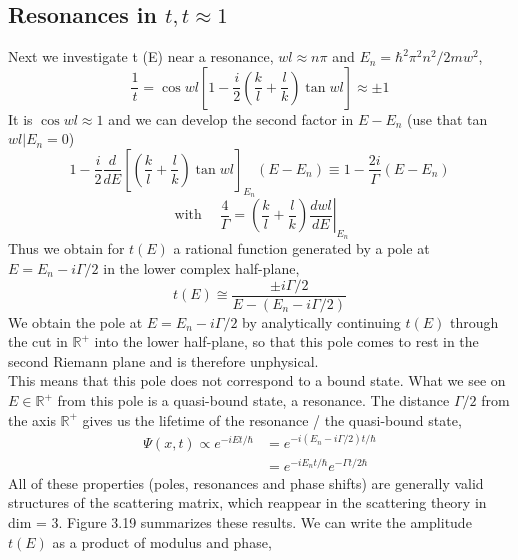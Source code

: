 \subsection{Resonances in $t, t \approx 1$}
 Next we investigate t (E) near a resonance, $wl ≈ n\pi$ and $E_n = \hbar^2\pi^2 n^2 / 2mw^2$,
\begin{equation}
    \frac{1}{t}=\cos w l\left[1-\frac{i}{2}\left(\frac{k}{l}+\frac{l}{k}\right) \tan w l\right] \approx \pm 1
    \end{equation}
It is $\operatorname{cos} wl \approx 1$ and we can develop the second factor in $E - E_n$ (use that tan $wl | E_n = 0$)
\begin{equation}
    1-\frac{i}{2} \frac{d}{d E}\left[\left(\frac{k}{l}+\frac{l}{k}\right) \tan w l\right]_{E_{n}}\left(E-E_{n}\right) \equiv 1-\frac{2 i}{\Gamma}\left(E-E_{n}\right)
    \end{equation}
\begin{equation}
    \operatorname{with} \quad \frac{4}{\Gamma}=\left.\left(\frac{k}{l}+\frac{l}{k}\right) \frac{d w l}{d E}\right|_{E_{n}}
    \end{equation}
Thus we obtain for $t(E)$ a rational function generated by a pole at $E = E_n - i\Gamma / 2$ in the lower complex half-plane,
$$
    t(E) \cong \frac{\pm i \Gamma / 2}{E-\left(E_{n}-i \Gamma / 2\right)}
$$
We obtain the pole at $E = E_n - i\Gamma / 2$ by analytically continuing $t (E)$ through the cut in $\mathbb{R}^+$ into the lower half-plane, so that this pole comes to rest in the second Riemann plane and is therefore unphysical.\\
This means that this pole does not correspond to a bound state. What we see on $E\in \mathbb{R}^+$ from this pole is a quasi-bound state, a resonance. The distance $\Gamma / 2$ from the axis $\mathbb{R}^+$ gives us the lifetime of the resonance / the quasi-bound state,
\begin{equation}
\begin{aligned} \Psi(x, t) \propto e^{-i E t / \hbar} &=e^{-i\left(E_{n}-i \Gamma / 2\right) t / \hbar} \\ &=e^{-i E_{n} t / \hbar} e^{-\Gamma t / 2 \hbar} \end{aligned}
\end{equation}
All of these properties (poles, resonances and phase shifts) are generally valid structures of the scattering matrix, which reappear in the scattering theory in dim = 3. Figure 3.19 summarizes these results.
We can write the amplitude $t (E)$ as a product of modulus and phase,
